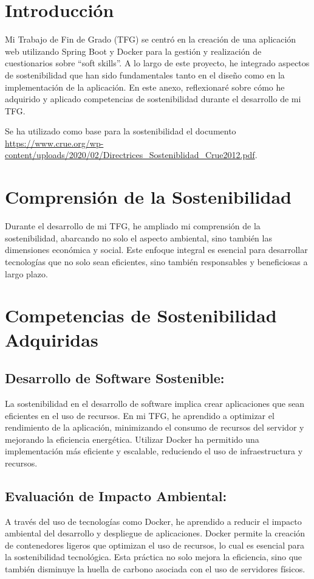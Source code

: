 
\section{Introducción}
Mi Trabajo de Fin de Grado (TFG) se centró en la creación de una aplicación web utilizando Spring Boot y Docker para la gestión y realización de cuestionarios sobre ``soft skills''. A lo largo de este proyecto, he integrado aspectos de sostenibilidad que han sido fundamentales tanto en el diseño como en la implementación de la aplicación. En este anexo, reflexionaré sobre cómo he adquirido y aplicado competencias de sostenibilidad durante el desarrollo de mi TFG.

Se ha utilizado como base para la sostenibilidad el documento \url{https://www.crue.org/wp-content/uploads/2020/02/Directrices_Sosteniblidad_Crue2012.pdf}.

\section{Comprensión de la Sostenibilidad}
Durante el desarrollo de mi TFG, he ampliado mi comprensión de la sostenibilidad, abarcando no solo el aspecto ambiental, sino también las dimensiones económica y social. Este enfoque integral es esencial para desarrollar tecnologías que no solo sean eficientes, sino también responsables y beneficiosas a largo plazo.

\section{Competencias de Sostenibilidad Adquiridas}
\subsection{Desarrollo de Software Sostenible:}

La sostenibilidad en el desarrollo de software implica crear aplicaciones que sean eficientes en el uso de recursos. En mi TFG, he aprendido a optimizar el rendimiento de la aplicación, minimizando el consumo de recursos del servidor y mejorando la eficiencia energética. Utilizar Docker ha permitido una implementación más eficiente y escalable, reduciendo el uso de infraestructura y recursos.

\subsection{Evaluación de Impacto Ambiental:}
A través del uso de tecnologías como Docker, he aprendido a reducir el impacto ambiental del desarrollo y despliegue de aplicaciones. Docker permite la creación de contenedores ligeros que optimizan el uso de recursos, lo cual es esencial para la sostenibilidad tecnológica. Esta práctica no solo mejora la eficiencia, sino que también disminuye la huella de carbono asociada con el uso de servidores físicos.


